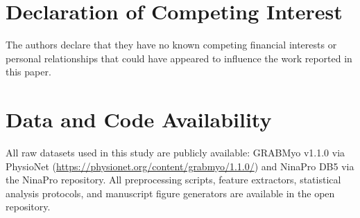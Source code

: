 \documentclass[final,5p,times,twocolumn]{elsarticle}
\begin{document}







\section*{Declaration of Competing Interest}
The authors declare that they have no known competing financial interests or personal relationships that could have appeared to influence the work reported in this paper.

\section*{Data and Code Availability}
All raw datasets used in this study are publicly available: GRABMyo v1.1.0 via PhysioNet (\url{https://physionet.org/content/grabmyo/1.1.0/}) and NinaPro DB5 via the NinaPro repository. All preprocessing scripts, feature extractors, statistical analysis protocols, and manuscript figure generators are available in the open repository.



\end{document}
